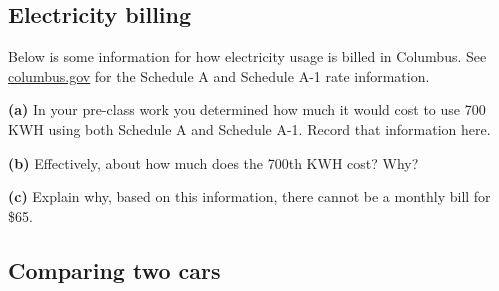 \documentclass[12pt]{ximera}
\begin{document}
\subsection*{Electricity billing}

\begin{problem}
Below is some information for how electricity usage is billed in Columbus. See
\href{https://www.columbus.gov/}{columbus.gov} for the Schedule A and Schedule A-1
rate information.


\begin{prompt}
\textbf{(a)} In your pre-class work you determined how much it would cost to use
700 KWH using both Schedule A and Schedule A-1. Record that information here.
\begin{freeResponse}
\end{freeResponse}
\end{prompt}

\begin{prompt}
\textbf{(b)} Effectively, about how much does the 700th KWH cost? Why?
\begin{freeResponse}
\end{freeResponse}
\end{prompt}

\begin{prompt}
\textbf{(c)} Explain why, based on this information, there cannot be a monthly bill
for \$65.
\begin{freeResponse}
\end{freeResponse}
\end{prompt}
\end{problem}

\subsection*{Comparing two cars}
\end{document}
